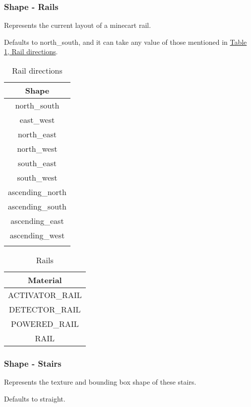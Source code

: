 \subsubsection{Shape - Rails}
Represents the current layout of a minecart rail.

Defaults to north\_south, and it can take any value of those mentioned in \hyperref[ab:rail]{Table \ref{ab:rail}, Rail directions}.

\begin{longtable}{ |c| }
	\hline
	Shape \\
	\hline
	\endhead
	north\_south \\
	east\_west \\
	\hline
	north\_east \\
	north\_west \\
	south\_east \\
	south\_west \\
	\hline
	ascending\_north \\
	ascending\_south \\
	ascending\_east \\
	ascending\_west \\
	\hline
	\caption{Rail directions}
	\label{ab:rail}
\end{longtable}

\begin{table}[H]
\centering
\begin{tabular}{ |c| }
	\hline
	Material \\
	\hline
	ACTIVATOR\_RAIL \\
	DETECTOR\_RAIL \\
	POWERED\_RAIL \\
	RAIL \\
	\hline
\end{tabular}
\caption{Rails}
\end{table}

\subsubsection{Shape - Stairs}
Represents the texture and bounding box shape of these stairs.

Defaults to straight.

